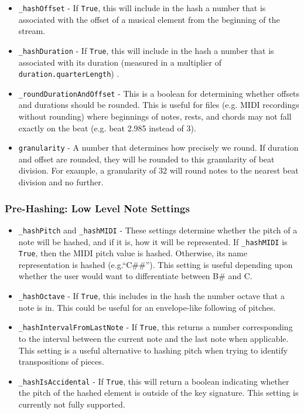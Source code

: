                     \begin{itemize}
                    \item \texttt{\_hashOffset} - If \texttt{True}, this will include in the hash a number that is associated with the offset of a musical element from the beginning of the stream. 
                    \item \texttt{\_hashDuration} - If \texttt{True}, this will include in the hash a number that is associated with its duration (measured in a multiplier of \texttt{duration.quarterLength}) .
                    \item \texttt{\_roundDurationAndOffset} - This is a boolean for determining whether offsets and durations should be rounded. This is useful for files (e.g. MIDI recordings without rounding) where beginnings of notes, rests, and chords may not fall exactly on the beat (e.g. beat 2.985 instead of 3).
                    \item \texttt{granularity} - A number that determines how precisely we round. If duration and offset are rounded, they will be rounded to this granularity of beat division. For example, a granularity of 32 will round notes to the nearest  beat division and no further.
                    \end{itemize}
        
        \subsubsection{Pre-Hashing: Low Level Note Settings}
                    \begin{itemize}
                    \item \texttt{\_hashPitch} and \texttt{\_hashMIDI} - These settings determine whether the pitch of a note will be hashed, and if it is, how it will be represented. If \texttt{\_hashMIDI} is \texttt{True}, then the MIDI pitch value is hashed. Otherwise, its name representation is hashed (e.g.``C\#\#''). This setting is useful depending upon whether the user would want to differentiate between B\# and C.
                    \item \texttt{\_hashOctave} - If \texttt{True}, this includes in the hash the number octave that a note is in. This could be useful for an envelope-like following of pitches. 
                    \item \texttt{\_hashIntervalFromLastNote} - If \texttt{True}, this returns a number corresponding to the interval between the current note and the last note when applicable. This setting is a useful alternative to hashing pitch when trying to identify transpositions of pieces.
                    \item \texttt{\_hashIsAccidental} - If \texttt{True}, this will return a boolean indicating whether the pitch of the hashed element is outside of the key signature. This setting is currently not fully supported. 
                    \end{itemize}
